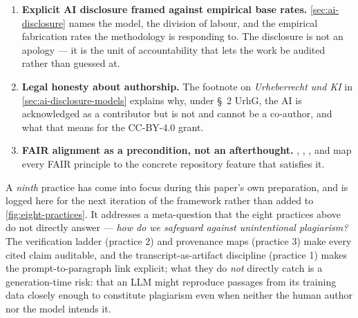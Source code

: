 \documentclass[11pt,a4paper]{article}
\begin{document}
\begin{enumerate}
        methodology that cannot describe its own production is not a
        methodology, it is a brand.
  \item \textbf{Explicit AI disclosure framed against empirical base
        rates.} \cref{sec:ai-disclosure} names the model, the division
        of labour, and the empirical fabrication rates the methodology
        is responding to. The disclosure is not an apology --- it is
        the unit of accountability that lets the work be audited rather
        than guessed at.
  \item \textbf{Legal honesty about authorship.} The footnote on
        \emph{Urheberrecht und KI} in
        \cref{sec:ai-disclosure-models} explains why, under
        \S{}~2 UrhG, the AI is acknowledged as a contributor but is
        not and cannot be a co-author, and what that means for the
        CC-BY-4.0 grant.
  \item \textbf{FAIR alignment as a precondition, not an afterthought.}
        ,
        ,
        , and
         map every FAIR principle to
        the concrete repository feature that satisfies it.
\end{enumerate}

A \emph{ninth} practice has come into focus during this paper's own
preparation, and is logged here for the next iteration of the
framework rather than added to \cref{fig:eight-practices}. It
addresses a meta-question that the eight practices above do not
directly answer --- \emph{how do we safeguard against unintentional
plagiarism?} The verification ladder (practice 2) and provenance maps
(practice 3) make every cited claim auditable, and the
transcript-as-artifact discipline (practice 1) makes the
prompt-to-paragraph link explicit; what they do \emph{not} directly
catch is a generation-time risk: that an LLM might reproduce passages
from its training data closely enough to constitute plagiarism even
when neither the human author nor the model intends it.
\end{document}
